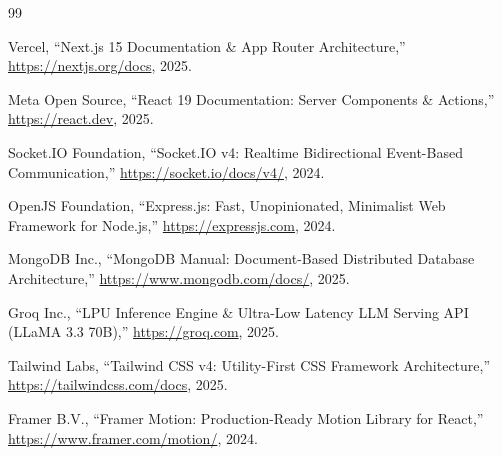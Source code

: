 \documentclass[12pt,a4paper]{report}
\begin{document}

\tableofcontents

\clearpage

\listoffigures

\clearpage

\listoftables

\clearpage



\setcounter{page}{1}









\begin{thebibliography}{99}

Vercel, ``Next.js 15 Documentation \& App Router Architecture,'' \url{https://nextjs.org/docs}, 2025.

Meta Open Source, ``React 19 Documentation: Server Components \& Actions,'' \url{https://react.dev}, 2025.

Socket.IO Foundation, ``Socket.IO v4: Realtime Bidirectional Event-Based Communication,'' \url{https://socket.io/docs/v4/}, 2024.

OpenJS Foundation, ``Express.js: Fast, Unopinionated, Minimalist Web Framework for Node.js,'' \url{https://expressjs.com}, 2024.

MongoDB Inc., ``MongoDB Manual: Document-Based Distributed Database Architecture,'' \url{https://www.mongodb.com/docs/}, 2025.

Groq Inc., ``LPU Inference Engine \& Ultra-Low Latency LLM Serving API (LLaMA 3.3 70B),'' \url{https://groq.com}, 2025.

Tailwind Labs, ``Tailwind CSS v4: Utility-First CSS Framework Architecture,'' \url{https://tailwindcss.com/docs}, 2025.

Framer B.V., ``Framer Motion: Production-Ready Motion Library for React,'' \url{https://www.framer.com/motion/}, 2024.

\end{thebibliography}
\end{document}
